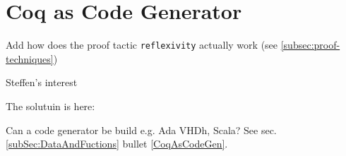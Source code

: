 \section{Coq as Code Generator}
\label{sec:coqAsACodeGenerator}

Add how does the proof tactic \lstinline!reflexivity! actually work \label{sec:reflexivity} (see \ref{subsec:proof-techniques})

Steffen's interest

The solutuin is here: \cite{ExtractingProgrammsinOCAMlandHaskell}

Can a code generator be build e.g. Ada VHDh, Scala? See sec. \ref{subSec:DataAndFuctions} bullet \ref{CoqAsCodeGen}.